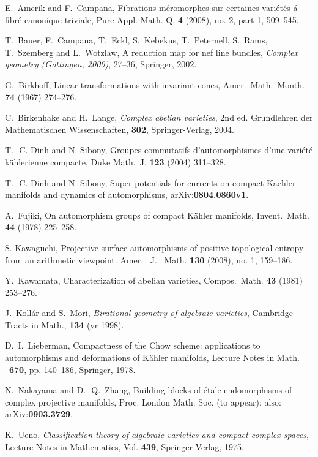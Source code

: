 \documentclass[11pt,a4paper,psamsfonts]{amsart}
\theoremstyle{plain}
\theoremstyle{definition}
\theoremstyle{remark}
\begin{document}
\begin{thebibliography}{99}

 E.~Amerik and F.~Campana,
Fibrations m\'eromorphes sur certaines vari\'et\'es \'a fibr\'e canonique triviale,
Pure Appl. Math. Q. \textbf{4} (2008), no. 2, part 1, 509--545.

T.~Bauer, F.~Campana, T.~Eckl, S.~Kebekus, T.~Peternell, S.~Rams, T.~Szemberg
and L.~Wotzlaw, A reduction map for nef line bundles,
{\it Complex geometry (G\"ottingen, 2000)}, 27--36, Springer, 2002.

 G.~Birkhoff,
Linear transformations with invariant cones,
Amer.\ Math.\ Month. \textbf{74} (1967) 274--276.

C.~Birkenhake and H.~Lange, {\it Complex abelian varieties}, 2nd ed.
Grundlehren der Mathematischen Wissenschaften, \textbf{302}, Springer-Verlag, 2004.

 T. -C. Dinh and N. Sibony,
Groupes commutatifs d'automorphismes d'une vari\'et\'e k\"ahlerienne compacte,
Duke Math.\ J. {\bf 123} (2004) 311--328.

 T. -C. Dinh and N. Sibony,
Super-potentials for currents on compact Kaehler manifolds and dynamics of automorphisms,
arXiv:\textbf{0804.0860v1}.

 A.~Fujiki,
On automorphism groups of compact K\"ahler manifolds,
Invent.\ Math. \textbf{44} (1978) 225--258.

S. Kawaguchi,
Projective surface automorphisms of positive topological entropy from an arithmetic viewpoint.
Amer. \ J. \ Math. \textbf{130} (2008), no. 1, 159--186.

 Y.~Kawamata,
Characterization of abelian varieties,
Compos.\ Math. \textbf{43} (1981) 253--276.

 J.~Koll\'ar and S.~Mori,
\emph{
Birational geometry of algebraic varieties},
Cambridge Tracts in Math., \textbf{134} (yr 1998).

 D.~I.~Lieberman, 
Compactness of the Chow scheme: applications to
automorphisms and deformations of K\"ahler manifolds, Lecture Notes
in Math. \ \textbf{670}, pp. 140--186, Springer, 1978.

 N.~Nakayama and D. -Q.~Zhang,
Building blocks of \'etale
endomorphisms of complex projective manifolds, 
Proc. London Math. Soc. (to appear); also: arXiv:\textbf{0903.3729}.

K.~Ueno,
{\it Classification theory of algebraic varieties and compact complex spaces},
Lecture Notes in Mathematics, Vol. \textbf{439},
Springer-Verlag, 1975.


\end{thebibliography}
\end{document}
